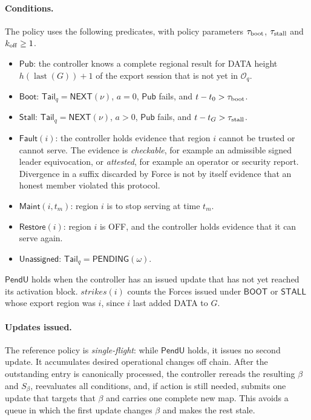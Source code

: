 \documentclass[11pt,a4paper]{article}
\newcommand{\tagg}[1]{\ensuremath{\mathsf{#1}}}
\newcommand{\defterm}[1]{\textcolor{rrBlue}{\textit{#1}}}
\newcounter{protocol}
\begin{document}
\paragraph{Conditions.}
The policy uses the following predicates, with policy parameters
$\tau_{\rm boot}$, $\tau_{\rm stall}$ and $k_{\rm off}\ge1$.
\begin{itemize}
\item $\tagg{Pub}$: the controller knows a complete regional result for
DATA height $h(\operatorname{last}(G))+1$ of the export session that is
not yet in $\mathcal O_q$.
\item $\tagg{Boot}$: $\mathsf{Tail}_q=\tagg{NEXT}(\nu)$, $a=0$, $\tagg{Pub}$ fails,
and $t-t_0>\tau_{\rm boot}$.
\item $\tagg{Stall}$: $\mathsf{Tail}_q=\tagg{NEXT}(\nu)$, $a>0$, $\tagg{Pub}$ fails,
and $t-t_G>\tau_{\rm stall}$.
\item $\tagg{Fault}(i)$: the controller holds evidence that region $i$
cannot be trusted or cannot serve. The evidence is \emph{checkable}, for
example an admissible signed leader equivocation, or
\emph{attested}, for example an operator or security report. Divergence
in a suffix discarded by Force is not by itself evidence that an honest
member violated this protocol.
\item $\tagg{Maint}(i,t_m)$: region $i$ is to stop serving at time $t_m$.
\item $\tagg{Restore}(i)$: region $i$ is OFF, and the controller holds
evidence that it can serve again.
\item $\tagg{Unassigned}$: $\mathsf{Tail}_q=\tagg{PENDING}(\omega)$.
\end{itemize}
$\tagg{PendU}$ holds when the controller has an issued update that has
not yet reached its activation block. $\mathit{strikes}(i)$ counts the
Forces issued under \tagg{BOOT} or \tagg{STALL} whose export region was
$i$, since $i$ last added DATA to $G$.

\paragraph{Updates issued.}
The reference policy is \defterm{single-flight}: while $\tagg{PendU}$
holds, it issues no second update. It accumulates desired operational
changes off chain. After the outstanding entry is canonically processed,
the controller rereads the resulting $\beta$ and $S_\beta$, reevaluates
all conditions, and, if action is still needed, submits one update that
targets that $\beta$ and carries one complete new map. This avoids a
queue in which the first update changes $\beta$ and makes the rest stale.
\end{document}
